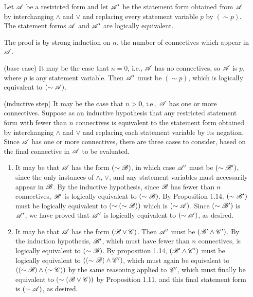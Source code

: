 \begin{proposition}
  Let \(\mathscr{A}\) be a restricted form and let \(\mathscr{A}'\) be the statement form obtained from \(\mathscr{A}\) by interchanging \(\land\) and \(\lor\) and replacing every statement variable \(p\) by \((\sim p)\). The statement forms \(\mathscr{A}\) and \(\mathscr{A}'\) are logically equivalent.

  \prf{} The proof is by strong induction on \(n\), the number of connectives which appear in \(\mathscr{A}\).

  (base case) It may be the case that \(n = 0\), i.e., \(\mathscr{A}\) has no connectives, so \(\mathscr{A}\) is \(p\), where \(p\) is any statement variable. Then \(\mathscr{A}'\) must be \((\sim p)\), which is logically equivalent to \((\sim\mathscr{A})\).

  (inductive step) It may be the case that \(n > 0\), i.e., \(\mathscr{A}\) has one or more connectives. Suppose as an inductive hypothesis that any restricted statement form with fewer than \(n\) connectives is equivalent to the statement form obtained by interchanging \(\land\) and \(\lor\) and replacing each statement variable by its negation. Since \(\mathscr{A}\) has one or more connectives, there are three cases to consider, based on the final connective in \(\mathscr{A}\) to be evaluated.

  \begin{enumerate}
    \item It may be that \(\mathscr{A}\) has the form \((\sim\mathscr{B})\), in which case \(\mathscr{A}'\) must be \((\sim\mathscr{B}')\), since the only instances of \(\land\), \(\lor\), and any statement variables must necessarily appear in \(\mathscr{B}\). By the inductive hypothesis, since \(\mathscr{B}\) has fewer than \(n\) connectives, \(\mathscr{B}'\) is logically equivalent to \((\sim\mathscr{B})\). By Proposition 1.14, \((\sim\mathscr{B}')\) must be logically equivalent to \((\sim(\sim\mathscr{B}))\) which is \((\sim\mathscr{A})\). Since \((\sim\mathscr{B}')\) is \(\mathscr{A}'\), we have proved that \(\mathscr{A}'\) is logically equivalent to \((\sim\mathscr{A})\), as desired.

    \item It may be that \(\mathscr{A}\) has the form \((\mathscr{B} \lor \mathscr{C})\). Then \(\mathscr{A}'\) must be \((\mathscr{B}' \land \mathscr{C}')\). By the induction hypothesis, \(\mathscr{B}'\), which must have fewer than \(n\) connectives, is logically equivalent to \((\sim\mathscr{B})\). By proposition 1.14, \((\mathscr{B}' \land \mathscr{C}')\) must be logically equivalent to \(((\sim\mathscr{B}) \land \mathscr{C}')\), which must again be equivalent to \(((\sim\mathscr{B}) \land (\sim\mathscr{C}))\) by the same reasoning applied to \(\mathscr{C}'\), which must finally be equivalent to \((\sim(\mathscr{B} \lor \mathscr{C}))\) by Proposition 1.11, and this final statement form is \((\sim\mathscr{A})\), as desired.


\end{enumerate}
\end{proposition}
